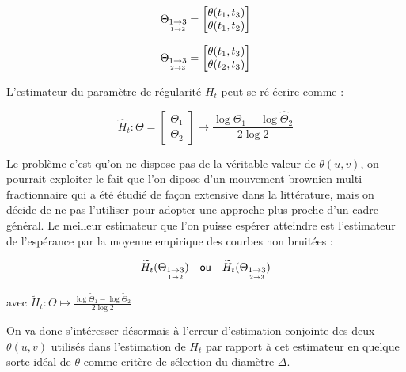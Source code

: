 \begin{minipage}{0.5\textwidth}
	\begin{equation*}
		\Theta_{\underset{1 \rightarrow 2}{1 \rightarrow 3}} = \begin{bmatrix} \theta(t_1, t_3) \\ \theta(t_1, t_2) \end{bmatrix}
	\end{equation*}
\end{minipage}
\hfill
\begin{minipage}{0.5\textwidth}
	\begin{equation*}
		\Theta_{\underset{2 \rightarrow 3}{1 \rightarrow 3}} = \begin{bmatrix} \theta(t_1, t_3) \\ \theta(t_2, t_3) \end{bmatrix}
	\end{equation*}
\end{minipage}

\smallskip

L'estimateur du paramètre de régularité $H_t$ peut se ré-écrire comme :

\smallskip


\begin{equation*}
	\widehat H_t : \Theta = \begin{bmatrix} \Theta_1 \\ \Theta_2 \end{bmatrix} \longmapsto \frac{ \log \widehat \Theta_1 - \log \widehat \Theta_2 }{2 \log 2}
\end{equation*}

\smallskip

Le problème c'est qu'on ne dispose pas de la véritable valeur de $\theta(u,v)$, on pourrait exploiter le fait que l'on dipose d'un mouvement brownien multi-fractionnaire qui a été étudié de façon extensive dans la littérature, mais on décide de ne pas l'utiliser pour adopter une approche plus proche d'un cadre général.
Le meilleur estimateur que l'on puisse espérer atteindre est l'estimateur de l'espérance par la moyenne empirique des courbes non bruitées :
 
\begin{equation*}
\widetilde H_t( \Theta_{\underset{1 \rightarrow 2}{1 \rightarrow 3}}) \quad \textsf{ou} \quad \widetilde H_t(  \Theta_{\underset{2 \rightarrow 3}{1 \rightarrow 3}})
\end{equation*}

avec $\widetilde H_t : \Theta \mapsto \frac{ \log \widetilde\Theta_1 - \log \widetilde\Theta_2 }{2 \log 2}$

\bigskip

\noindent On va donc s'intéresser désormais à l'erreur d'estimation conjointe des deux $\theta(u,v)$ utilisés dans l'estimation de $H_t$ par rapport à cet estimateur en quelque sorte \og idéal \fg de $\theta$ comme critère de sélection du diamètre $\Delta$.

